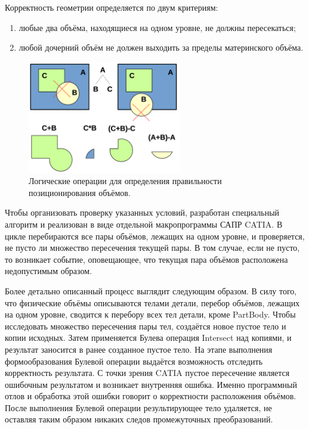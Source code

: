 Корректность геометрии определяется по двум критериям:
\begin{enumerate}
\item любые два объёма, находящиеся на одном уровне, не должны пересекаться;
\item любой дочерний объём не должен выходить за пределы материнского объёма.
\end{enumerate}

\begin{figure}[H]
\centering
\includegraphics[width=0.6\textwidth]{pictures/Checker.png}
\caption{Логические операции для определения правильности позиционирования объёмов.}
\label{fig:CheckerOperations}
\end{figure}

Чтобы организовать проверку указанных условий, разработан специальный алгоритм и реализован в виде отдельной макропрограммы  САПР CATIA. В цикле перебираются все пары объёмов, лежащих на одном уровне, и проверяется, не пусто ли множество пересечения текущей пары. В том случае, если не пусто, то возникает событие, оповещающее, что текущая пара объёмов расположена недопустимым образом.

Более детально описанный процесс выглядит следующим образом. В силу того, что физические объёмы описываются телами детали, перебор объёмов, лежащих на одном уровне, сводится к перебору всех тел детали, кроме PartBody. Чтобы исследовать множество пересечения пары тел, создаётся новое пустое тело и копии исходных. Затем применяется Булева операция Intersect над копиями, и результат заносится в ранее созданное пустое тело. На этапе выполнения формообразования Булевой операции выдаётся возможность отследить корректность результата. С точки зрения CATIA пустое пересечение является ошибочным результатом и возникает внутренняя ошибка. Именно программный отлов и обработка этой ошибки говорит о корректности расположения объёмов. После выполнения Булевой операции результирующее тело удаляется, не оставляя таким образом никаких следов промежуточных преобразований.

